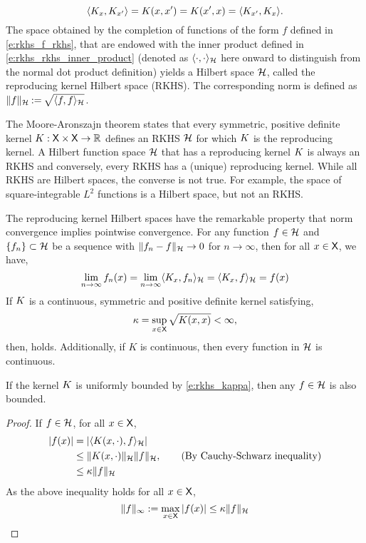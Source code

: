 \begin{equation}
\langle K_x, K_{x'} \rangle =  K(x,x') = K(x',x) =  \langle K_{x'}, K_x \rangle. 
\end{equation}
The space obtained by the completion of functions of the form $f$ defined in \eqref{e:rkhs_f_rkhs}, that are endowed with the inner product defined in \eqref{e:rkhs_rkhs_inner_product} (denoted as $\langle \cdot, \cdot \rangle_{{\cal H}}$ here onward to distinguish from the normal dot product definition) yields a Hilbert space ${\cal H}$, called the reproducing kernel Hilbert space (RKHS). The corresponding norm is defined as $\|f\|_{\cal H} \mathbin{:=} \sqrt{\langle f, f \rangle_{\cal H}}$. 

The Moore-Aronszajn theorem states that every symmetric, positive definite kernel $K : {\sf X} \times {\sf X} \to \mathbb{R}$ defines an RKHS ${\cal H}$ for which $K$ is the reproducing kernel. A Hilbert function space ${\cal H}$ that has a reproducing kernel $K$ is always an RKHS and conversely, every RKHS has a (unique) reproducing kernel. While all RKHS are Hilbert spaces, the converse is not true. For example, the space of square-integrable $L^2$ functions is a Hilbert space, but not an RKHS. 

The reproducing kernel Hilbert spaces have the remarkable property that norm convergence implies pointwise convergence. 
For any function $f\in{\cal H}$ and $\{f_n\}\subset {\cal H}$ be a sequence with $\|f_n - f\|_{\cal H} \to 0$ for $n \to \infty$, then for all $x \in {\sf X}$, we have,
\begin{equation}
\lim_{n\to\infty} f_n(x) = \lim_{n \to \infty} \langle K_x,  f_n \rangle_{\cal H} = \langle K_x, f \rangle_{\cal H} = f(x)
\end{equation}
If $K$ is a continuous, symmetric and positive definite kernel satisfying, 
\begin{equation}
\kappa = \sup_{x \in \state} \sqrt{\Kern(x,x)} < \infty,
\label{e:rkhs_kappa}
\end{equation}
then,  holds. Additionally, if $K$ is continuous, then every function in ${\cal H}$ is continuous. 
\begin{proposition}
\label{prop:RKHS_bounded}
	If the kernel $K$ is uniformly bounded by \eqref{e:rkhs_kappa}, then any $f \in {\cal H}$ is also bounded. 
\end{proposition}
\begin{proof}
	If $f \in {\cal H}$, for all $x \in {\sf X}$,
	\begin{equation}
	\begin{aligned}
	|f(x)| &= |\langle K(x,\cdot), f \rangle_{\cal H}| \\
	& \leq \|K(x,\cdot)\|_{\cal H} \|f\|_{\cal H}, \qquad{\text{(By Cauchy-Schwarz inequality)}}\\ 
	& \leq \kappa \|f\|_{\cal H}
	\end{aligned}
	\end{equation}
	As the above inequality holds for all $x \in {\sf X}$, 
	\begin{equation}
	\|f\|_\infty := \max_{x\in {\sf X}}|f(x)| \leq \kappa \|f\|_{\cal H}
	\end{equation}
\end{proof}


